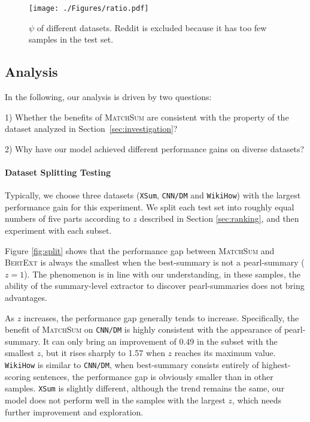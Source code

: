 \begin{figure}
    \centering
    \texttt{[image: ./Figures/ratio.pdf]}
    \caption{$\psi$ of different datasets. Reddit is excluded because it has too few samples in the test set.}
    \label{fig:ratio}
\end{figure}

\subsection{Analysis}
\label{sec:Analyzing}
In the following, our analysis is driven by two questions:

1) Whether the benefits of \textsc{MatchSum} are consistent with the property of the dataset analyzed in Section~\ref{sec:investigation}?

2) Why have our model achieved different performance gains on diverse datasets?

\paragraph{Dataset Splitting Testing} Typically, we choose three datasets (\texttt{XSum}, \texttt{CNN/DM} and \texttt{WikiHow}) with the largest performance gain for this experiment. We split each test set into roughly equal numbers of five parts according to $z$ described in Section \ref{sec:ranking}, and then experiment with each subset.

Figure \ref{fig:split} shows that the performance gap between \textsc{MatchSum} and \textsc{BertExt} is always the smallest when the best-summary is not a pearl-summary ($z = 1$). The phenomenon is in line with our understanding, in these samples, the ability of the summary-level extractor to discover pearl-summaries does not bring advantages.

As $z$ increases, the performance gap generally tends to increase. Specifically, the benefit of \textsc{MatchSum} on \texttt{CNN/DM} is highly consistent with the appearance of pearl-summary. It can only bring an improvement of 0.49 in the subset with the smallest $z$, but it rises sharply to 1.57 when $z$ reaches its maximum value. \texttt{WikiHow} is similar to \texttt{CNN/DM}, when best-summary consists entirely of highest-scoring sentences, the performance gap is obviously smaller than in other samples. \texttt{XSum} is slightly different, although the trend remains the same, our model does not perform well in the samples with the largest $z$, which needs further improvement and exploration.

